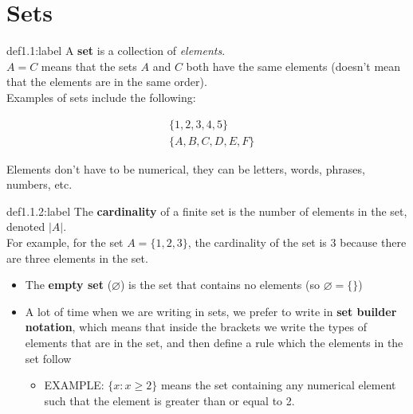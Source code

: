 \section{Sets}

\begin{definition}{def1.1:label}
    A \textbf{set} is a collection of \textit{elements}.\\

    $A = C$ means that the sets $A$ and $C$ both have the same elements (doesn't mean that the elements are in the same order).\\

    Examples of sets include the following:

    \begin{equation*}
        \begin{aligned}
            &\{1,2,3,4,5\}\\
            &\{A,B,C,D,E,F\}
        \end{aligned}
    \end{equation*}

    Elements don't have to be numerical, they can be letters, words, phrases, numbers, etc.
\end{definition}

\begin{definition}[Cardinality]{def1.1.2:label}
    The \textbf{cardinality} of a finite set is the number of elements in the set, denoted $|A|$. \\

    For example, for the set $A = \{1,2,3\}$, the cardinality of the set is $3$ because there are three elements in the set.
\end{definition}


\begin{itemize}
    \item The \textbf{empty set} ($\varnothing$) is the set that contains no elements (so $\varnothing = \{\}$)
    \item A lot of time when we are writing in sets, we prefer to write in \textbf{set builder notation}, which means that inside the brackets we write the types of elements that are in the set, and then define a rule which the elements in the set follow
    \begin{itemize}
        \item EXAMPLE: $\{x : x \ge 2\}$ means the set containing any numerical element such that the element is greater than or equal to 2.
    \end{itemize}
\end{itemize}\newpage


